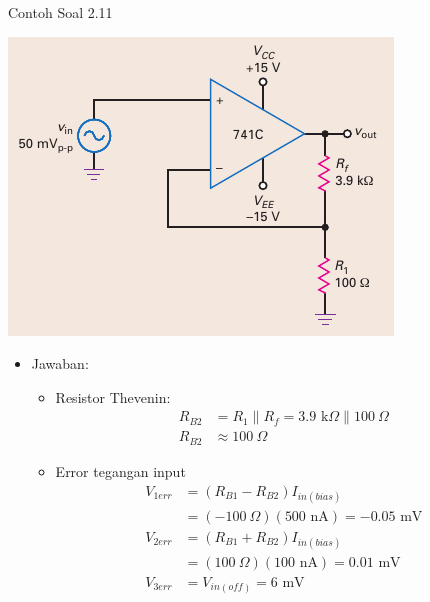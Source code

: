\begin{frame}{Contoh Soal 2.11}
	\begin{multicols}{2}
		\begin{center}
			\includegraphics[width=\linewidth]{gambar/fig-16.22a}
		\end{center}
		\columnbreak
		\begin{itemize}
			\item Jawaban:
			\begin{itemize}
				\item Resistor Thevenin:
				\begin{align*}
					R_{B2} &= R_1 \parallel R_f = 3.9 \text{ k}\Omega \parallel 100~\Omega \\
					R_{B2} &\approx 100~\Omega
				\end{align*}
				\item Error tegangan input
				\begin{align*}
					V_{1err} &= (R_{B1} - R_{B2})I_{in(bias)}  \\
					&= (-100~\Omega)(500 \text{ nA}) = -0.05 \text{ mV}\\
					V_{2err} &= (R_{B1} + R_{B2})I_{in(bias)} \\
					&= (100~\Omega)(100 \text{ nA}) = 0.01 \text{ mV}\\
					V_{3err} &= V_{in(off)} = 6 \text{ mV}
				\end{align*}
			\end{itemize}
		\end{itemize}
	\end{multicols}
\end{frame}

